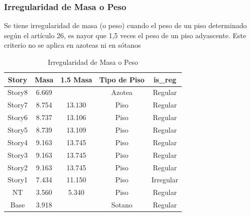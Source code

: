 \documentclass{article}%
\begin{document}
%
\subsubsection{Irregularidad de Masa o Peso}%
\label{ssubsec:IrregularidaddeMasaoPeso}%
\begin{tcolorbox}[colback=gray!5!white,colframe=cyan!75!black,fonttitle=\bfseries,title=Tabla N°9 E-030]%
Se tiene irregularidad de masa (o peso) cuando el peso de un piso determinado según el artículo 26, es nayor que 1,5 veces el peso de un piso adyascente. Este criterio no se aplica en azoteas ni en sótanos%
\end{tcolorbox}%


\begin{table}[h!]%
\centering%
\caption{Irregularidad de Masa o Peso}%
\begin{tabular}{ccccc}
\toprule
Story & Masa & 1.5 Masa & Tipo de Piso & is\_reg \\
\midrule
Story8 & 6.669 &  & Azotea & Regular \\
Story7 & 8.754 & 13.130 & Piso & Regular \\
Story6 & 8.737 & 13.106 & Piso & Regular \\
Story5 & 8.739 & 13.109 & Piso & Regular \\
Story4 & 9.163 & 13.745 & Piso & Regular \\
Story3 & 9.163 & 13.745 & Piso & Regular \\
Story2 & 9.163 & 13.745 & Piso & Regular \\
Story1 & 7.434 & 11.150 & Piso & Irregular \\
NT & 3.560 & 5.340 & Piso & Regular \\
Base & 3.918 &  & Sotano & Regular \\
\bottomrule
\end{tabular}
%
\end{table}

%
\end{document}
